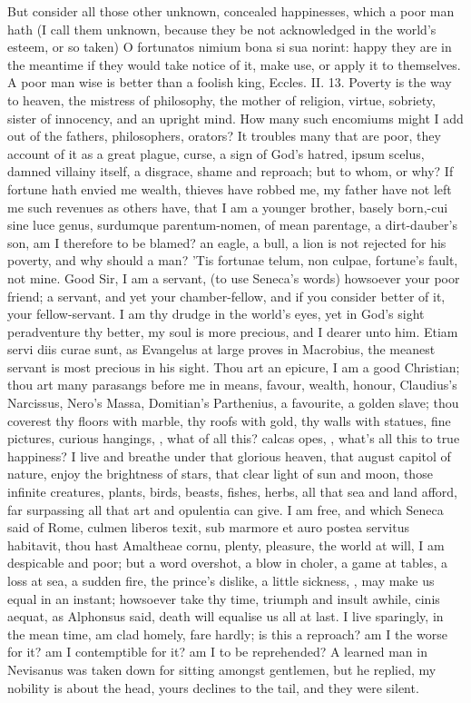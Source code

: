 {But consider all those other unknown, concealed happinesses, which a
poor man hath (I call them unknown, because they be not acknowledged in
the world's esteem, or so taken) O fortunatos nimium bona si sua
norint: happy they are in the meantime if they would take notice of it,
make use, or apply it to themselves. A poor man wise is better than a
foolish king, Eccles. II. 13. Poverty is the way to heaven,
the mistress of philosophy, the mother of religion, virtue,
sobriety, sister of innocency, and an upright mind. How many such
encomiums might I add out of the fathers, philosophers, orators? It
troubles many that are poor, they account of it as a great plague,
curse, a sign of God's hatred, ipsum scelus, damned villainy itself, a
disgrace, shame and reproach; but to whom, or why? If fortune
hath envied me wealth, thieves have robbed me, my father have not left
me such revenues as others have, that I am a younger brother, basely
born,-cui sine luce genus, surdumque parentum-nomen, of mean parentage,
a dirt-dauber's son, am I therefore to be blamed? an eagle, a bull, a
lion is not rejected for his poverty, and why should a man? 'Tis
fortunae telum, non culpae, fortune's fault, not mine. Good Sir,
I am a servant, (to use Seneca's words) howsoever your poor
friend; a servant, and yet your chamber-fellow, and if you consider
better of it, your fellow-servant. I am thy drudge in the world's eyes,
yet in God's sight peradventure thy better, my soul is more precious,
and I dearer unto him. Etiam servi diis curae sunt, as Evangelus at
large proves in Macrobius, the meanest servant is most precious in his
sight. Thou art an epicure, I am a good Christian; thou art many
parasangs before me in means, favour, wealth, honour, Claudius's
Narcissus, Nero's Massa, Domitian's Parthenius, a favourite, a golden
slave; thou coverest thy floors with marble, thy roofs with gold, thy
walls with statues, fine pictures, curious hangings, \etc{}, what of all
this? calcas opes, \etc{}, what's all this to true happiness? I live and
breathe under that glorious heaven, that august capitol of nature,
enjoy the brightness of stars, that clear light of sun and moon, those
infinite creatures, plants, birds, beasts, fishes, herbs, all that sea
and land afford, far surpassing all that art and opulentia can give. I
am free, and which Seneca said of Rome, culmen liberos texit, sub
marmore et auro postea servitus habitavit, thou hast Amaltheae cornu,
plenty, pleasure, the world at will, I am despicable and poor; but a
word overshot, a blow in choler, a game at tables, a loss at sea, a
sudden fire, the prince's dislike, a little sickness, \etc{}, may make us
equal in an instant; howsoever take thy time, triumph and insult
awhile, cinis aequat, as Alphonsus said, death will equalise us
all at last. I live sparingly, in the mean time, am clad homely, fare
hardly; is this a reproach? am I the worse for it? am I contemptible
for it? am I to be reprehended? A learned man in  Nevisanus was
taken down for sitting amongst gentlemen, but he replied, my nobility
is about the head, yours declines to the tail, and they were silent.

}
